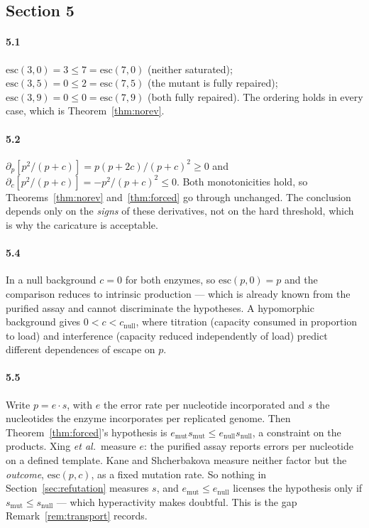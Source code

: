 \subsection*{Section 5}

\paragraph{5.1}
$\mathrm{esc}(3, 0) = 3 \le 7 = \mathrm{esc}(7, 0)$ (neither saturated);
$\mathrm{esc}(3, 5) = 0 \le 2 = \mathrm{esc}(7, 5)$ (the mutant is fully repaired);
$\mathrm{esc}(3, 9) = 0 \le 0 = \mathrm{esc}(7, 9)$ (both fully repaired).
The ordering holds in every case, which is Theorem~\ref{thm:norev}.

\paragraph{5.2}
$\partial_p\left[p^2/(p+c)\right] = p(p + 2c)/(p+c)^2 \ge 0$ and
$\partial_c\left[p^2/(p+c)\right] = -p^2/(p+c)^2 \le 0$. Both monotonicities
hold, so Theorems~\ref{thm:norev} and~\ref{thm:forced} go through unchanged. The
conclusion depends only on the \emph{signs} of these derivatives, not on the
hard threshold, which is why the caricature is acceptable.

\paragraph{5.4}
In a null background $c = 0$ for both enzymes, so
$\mathrm{esc}(p, 0) = p$ and the comparison reduces to intrinsic production ---
which is already known from the purified assay and cannot discriminate the
hypotheses. A hypomorphic background gives $0 < c < c_{\mathrm{null}}$, where
titration (capacity consumed in proportion to load) and interference (capacity
reduced independently of load) predict different dependences of escape on $p$.

\paragraph{5.5}
Write $p = e \cdot s$, with $e$ the error rate per nucleotide incorporated and
$s$ the nucleotides the enzyme incorporates per replicated genome. Then
Theorem~\ref{thm:forced}'s hypothesis is
$e_{\mathrm{mut}} s_{\mathrm{mut}} \le e_{\mathrm{null}} s_{\mathrm{null}}$,
a constraint on the products. Xing \emph{et al.}\ measure $e$: the purified assay
reports errors per nucleotide on a defined template. Kane and Shcherbakova
measure neither factor but the \emph{outcome}, $\mathrm{esc}(p,c)$, as a fixed
mutation rate. So nothing in Section~\ref{sec:refutation} measures $s$, and
$e_{\mathrm{mut}} \le e_{\mathrm{null}}$ licenses the hypothesis only if
$s_{\mathrm{mut}} \le s_{\mathrm{null}}$ --- which hyperactivity makes
doubtful. This is the gap Remark~\ref{rem:transport} records.

